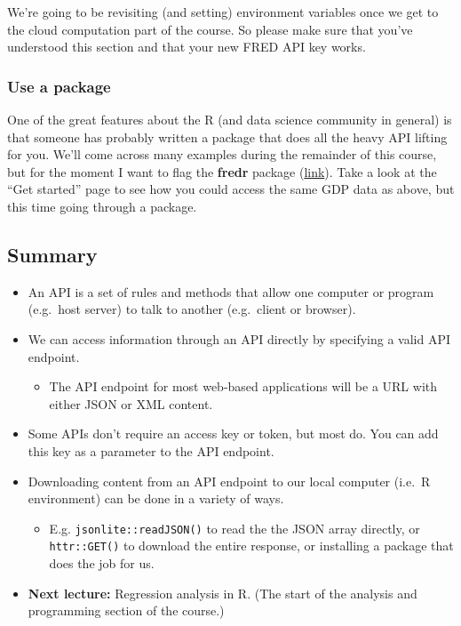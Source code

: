 \documentclass[
]{article}
\providecommand{\tightlist}{%
  \setlength{\itemsep}{0pt}\setlength{\parskip}{0pt}}
\begin{document}
We're going to be revisiting (and setting) environment variables once we
get to the cloud computation part of the course. So please make sure
that you've understood this section and that your new FRED API key
works.

\hypertarget{use-a-package}{%
\subsubsection{Use a package}\label{use-a-package}}

One of the great features about the R (and data science community in
general) is that someone has probably written a package that does all
the heavy API lifting for you. We'll come across many examples during
the remainder of this course, but for the moment I want to flag the
\textbf{fredr} package
(\href{http://sboysel.github.io/fredr/index.html}{link}). Take a look at
the ``Get started'' page to see how you could access the same GDP data
as above, but this time going through a package.

\hypertarget{summary}{%
\subsection{Summary}\label{summary}}

\begin{itemize}
\tightlist
\item
  An API is a set of rules and methods that allow one computer or
  program (e.g.~host server) to talk to another (e.g.~client or
  browser).
\item
  We can access information through an API directly by specifying a
  valid API endpoint.

  \begin{itemize}
  \tightlist
  \item
    The API endpoint for most web-based applications will be a URL with
    either JSON or XML content.
  \end{itemize}
\item
  Some APIs don't require an access key or token, but most do. You can
  add this key as a parameter to the API endpoint.
\item
  Downloading content from an API endpoint to our local computer (i.e.~R
  environment) can be done in a variety of ways.

  \begin{itemize}
  \tightlist
  \item
    E.g. \texttt{jsonlite::readJSON()} to read the the JSON array
    directly, or \texttt{httr::GET()} to download the entire response,
    or installing a package that does the job for us.
  \end{itemize}
\item
  \textbf{Next lecture:} Regression analysis in R. (The start of the
  analysis and programming section of the course.)
\end{itemize}
\end{document}
